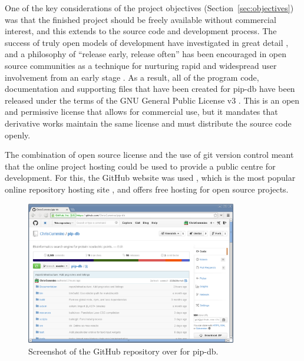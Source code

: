 One of the key considerations of the project objectives
(Section~\ref{sec:objectives}) was that the finished project should be
freely available without commercial interest, and this extends to the
source code and development process. The success of truly open models
of development have investigated in great detail
\cite{weber2004success, godfrey2000evolution, chesbrough2006open,
  von2005democratizing}, and a philosophy of ``release early, release
often'' has been encouraged in open source communities as a technique
for nurturing rapid and widespread user involvement from an early
stage \cite{raymond1999cathedral}. As a result, all of the program
code, documentation and supporting files that have been created for
pip-db have been released under the terms of the GNU General Public
License v3 \cite{gnu2007gpl}. This is an open and permissive license
that allows for commercial use, but it mandates that derivative works
maintain the same license and must distribute the source code openly.

The combination of open source license and the use of git version
control meant that the online project hosting could be used to provide
a public centre for development. For this, the GitHub website was used
\cite{cummins2014pip-db}, which is the most popular online repository
hosting site \cite{finley2011github}, and offers free hosting for open
source projects.


\begin{figure}[H]
\centering
    \includegraphics[width=0.82\textwidth]{assets/github}
\caption[Screenshot of GitHub project homepage]
        {Screenshot of the GitHub repository over for pip-db.}
\label{fig:github-project}
\end{figure}


